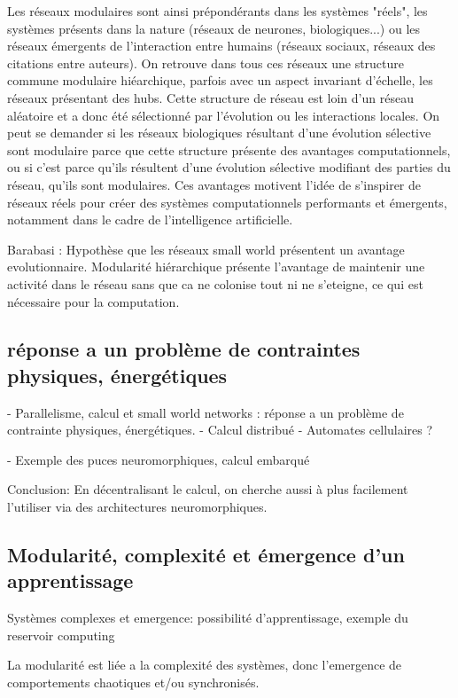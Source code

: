 Les réseaux modulaires sont ainsi prépondérants dans les systèmes "réels", les systèmes présents dans la nature (réseaux de neurones, biologiques...) ou les réseaux émergents de l'interaction entre humains (réseaux sociaux, réseaux des citations entre auteurs). On retrouve dans tous ces réseaux une structure commune modulaire hiéarchique, parfois avec un aspect invariant d'échelle, les réseaux présentant des hubs. Cette structure de réseau est loin d'un réseau aléatoire et a donc été sélectionné par l'évolution ou les interactions locales. On peut se demander si les réseaux biologiques résultant d'une évolution sélective sont modulaire parce que cette structure présente des avantages computationnels, ou si c'est parce qu'ils résultent d'une évolution sélective modifiant des parties du réseau, qu'ils sont modulaires. 
Ces avantages motivent l'idée de s'inspirer de réseaux réels pour créer des systèmes computationnels performants et émergents, notamment dans le cadre de l'intelligence artificielle. 

Barabasi : Hypothèse que les réseaux small world présentent un avantage evolutionnaire.
Modularité hiérarchique présente l'avantage de maintenir une activité dans le réseau sans que ca ne colonise tout ni ne s'eteigne, ce qui est nécessaire pour la computation. 



\subsection{réponse a un problème de contraintes physiques, énergétiques}


- Parallelisme, calcul et small world networks : réponse a un problème de contrainte physiques, énergétiques. 
- Calcul distribué 
- Automates cellulaires ?

- Exemple des puces neuromorphiques, calcul embarqué


Conclusion: En décentralisant le calcul, on cherche aussi à plus facilement l'utiliser via des architectures neuromorphiques. 

\subsection{Modularité, complexité et émergence d'un apprentissage }


Systèmes complexes et emergence: possibilité d'apprentissage, exemple du reservoir computing

La modularité est liée a la complexité des systèmes, donc l'emergence de comportements chaotiques et/ou synchronisés. 

